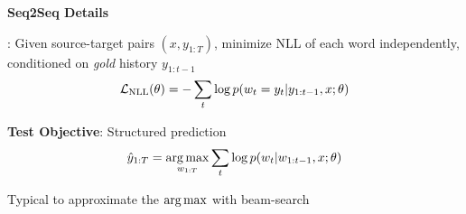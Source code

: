 \documentclass{beamer}
\let\tempone\itemize
\let\temptwo\enditemize
\renewenvironment{itemize}{\tempone\addtolength{\itemsep}{0.5\baselineskip}}{\temptwo}
\newcommand{\air}{\vspace{0.25cm}}
\newcommand{\given}{\,|\,}
\newcommand{\mcV}{\mathcal{V}}
\def\argmax{\operatornamewithlimits{arg\,max}}
\def\argmax{\operatornamewithlimits{arg\,max}}
\begin{document}
 


\begin{frame}
  \centerline{\textbf{Seq2Seq Details}}
  \textbf{}: Given source-target pairs $(x, y_{1:T})$, minimize NLL of each word independently, conditioned on \textit{gold} history $y_{1:t-1}$
\begin{align*}
{\cal L}_{\text{NLL}}(\theta) = -\sum_{t} \log p(w_{t} = y_t | y_{1:t-1}, x; \theta) 
\end{align*}

  \air

\textbf{\alert{Test Objective}}:  Structured prediction
  \begin{align*}
  \hat{y}_{1:T} = \argmax_{w_{1:T}} \sum_{t} \log p(w_{t} | w_{1:t-1}, x; \theta)
\end{align*}
\begin{itemize}
\item Typical to approximate the $\argmax$ with beam-search
\end{itemize}
\end{frame}
\end{document}
